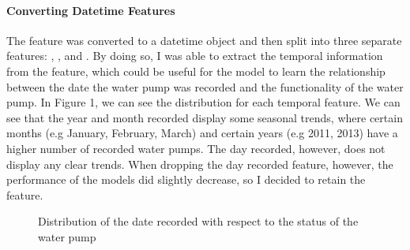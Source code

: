 \documentclass{article}
\begin{document}
\paragraph{Converting Datetime Features}
The  feature was converted to a datetime object and then split into three separate features: , , and . By doing so, I was able to extract the temporal information from the feature, which could be useful for the model to learn the relationship between the date the water pump was recorded and the functionality of the water pump. In Figure 1, we can see the distribution for each temporal feature. We can see that the year and month recorded display some seasonal trends, where certain months (e.g January, February, March) and certain years (e.g 2011, 2013) have a higher number of recorded water pumps. The day recorded, however, does not display any clear trends. When dropping the day recorded feature, however, the performance of the models did slightly decrease, so I decided to retain the feature.

\begin{figure}[H]
    \centering
    \caption{Distribution of the date recorded with respect to the status of the water pump}
\end{figure}
\end{document}
